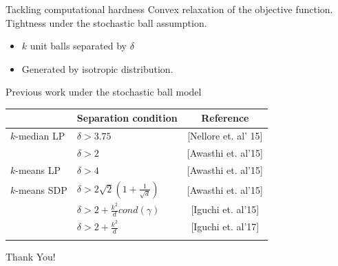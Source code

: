 \documentclass{beamer}
\begin{document}
\begin{frame}{Tackling computational hardness}
	Convex relaxation of the objective function.\\
	\vspace{20pt}Tightness under the {\color{blue}stochastic ball assumption}.
	\begin{itemize}
		\vspace{10pt}\item $k$ unit balls separated by $\delta$
		\vspace{10pt}\item Generated by isotropic distribution. 
	\end{itemize}	
\end{frame}

\begin{frame}{Previous work under the stochastic ball model}
	\begin{table}
		\centering
		\label{table:stochasticBall}
		\setlength{\tabcolsep}{0.7em} 
		{\renewcommand{\arraystretch}{1.5}%
		\begin{tabular}{llc}
		\\
		 & Separation condition & Reference\\
		 \hline
		$k$-median LP & $\delta > 3.75$ & \alert{[Nellore et. al' 15]}\\
		 & $\delta > 2$ & \alert{[Awasthi et. al'15]}\\
		\hline
		$k$-means LP & $\delta > 4$ & \alert{[Awasthi et. al'15]}\\
		\hline
		$k$-means SDP & $\delta > 2\sqrt2 (1 + \frac{1}{\sqrt d})$ & \alert{[Awasthi et. al'15]}\\
		 & $\delta > 2 + \frac{k^2}{d}cond(\gamma)$ & \alert{[Iguchi et. al'15]}\\
		 & $\delta > 2 + \frac{k^2}{d}$ & \alert{[Iguchi et. al'17]}\\

		\label{table:alphacenter}
		\end{tabular}
		}
	\end{table}
\end{frame}

\begin{frame}
    \Huge{\centerline{Thank You!}}
\end{frame}
\end{document}
